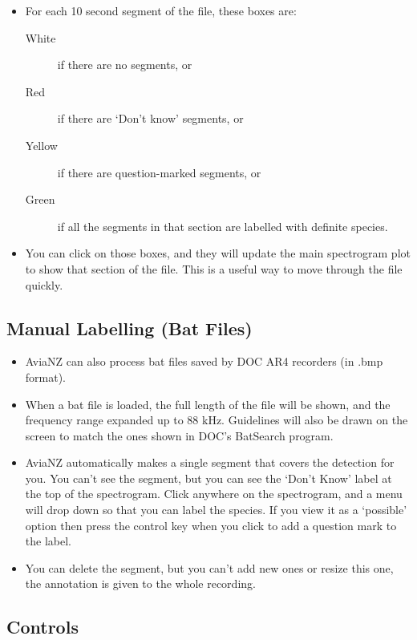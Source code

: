 \documentclass{article}
\begin{document}
\begin{itemize}
\item For each 10 second segment of the file, these boxes are:
	\begin{description} 
 	\item[White] if there are no segments, or
	\item[Red] if there are `Don't know' segments, or
	\item[Yellow] if there are question-marked segments, or 
	\item[Green] if all the segments in that section are labelled with definite species. 
	\end{description}
	
\item You can click on those boxes, and they will update the main spectrogram plot to show that section of the file. This is a useful way to move through the file quickly.
\end{itemize}

\subsection{Manual Labelling (Bat Files) \label{sec:bats}}

\begin{itemize}
\item AviaNZ can also process bat files saved by DOC AR4 recorders (in .bmp format). 
\item When a bat file is loaded, the full length of the file will be shown, and the frequency range expanded up to 88 kHz. Guidelines will also be drawn on the screen to match the ones shown in DOC's BatSearch program. 
\item AviaNZ automatically makes a single segment that covers the detection for you. You can't see the segment, but you can see the `Don't Know' label at the top of the spectrogram. Click anywhere on the spectrogram, and a menu will drop down so that you can label the species. If you view it as a `possible' option then press the control key when you click to add a question mark to the label.
\item You can delete the segment, but you can't add new ones or resize this one, the annotation is given to the whole recording.
\end{itemize}

\subsection{Controls \label{sec:play}}
\end{document}
